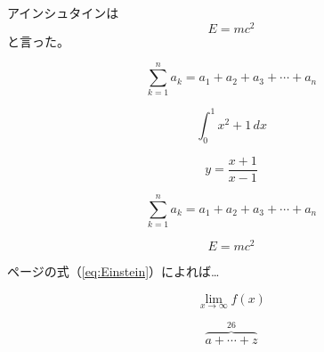\documentclass{jsarticle}
\begin{document}
アインシュタインは
\[ E=mc^2 \]
と言った。

\[ \sum_{k=1}^n a_k = a_1 + a_2 + a_3 + \cdots + a_n \]

\[ \int_0^1 x^2 + 1\,dx \]

\[ y=\frac{x+1}{x-1} \]

\begin{equation}
	\sum_{k=1}^n a_k = a_1 + a_2 + a_3 + \cdots + a_n
\end{equation}

\begin{equation}
	E = mc^2 \label{eq:Einstein}
\end{equation}

\pageref{eq:Einstein}ページの式（\ref{eq:Einstein}）によれば…

\[ \lim_{x \to \infty} f(x) \]

\[ \overbrace{a + \cdots + z}^{26} \]
\end{document}
